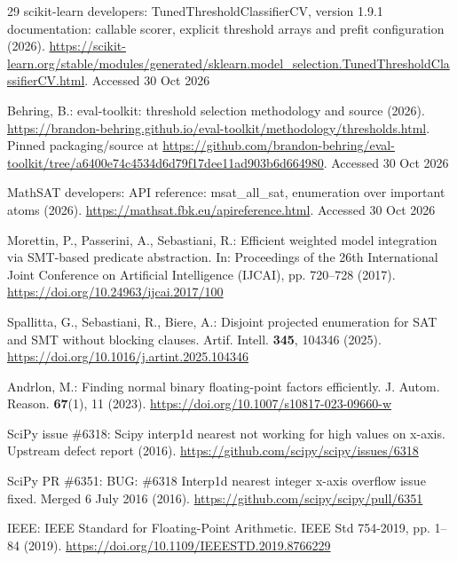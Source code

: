\documentclass[11pt,a4paper]{article}
\theoremstyle{plain}
\theoremstyle{definition}
\theoremstyle{remark}
\begin{document}
\begin{thebibliography}{29}
scikit-learn developers: TunedThresholdClassifierCV, version 1.9.1 documentation: callable scorer, explicit threshold arrays and prefit configuration (2026). \url{https://scikit-learn.org/stable/modules/generated/sklearn.model_selection.TunedThresholdClassifierCV.html}. Accessed 30 Oct 2026

Behring, B.: eval-toolkit: threshold selection methodology and source (2026). \url{https://brandon-behring.github.io/eval-toolkit/methodology/thresholds.html}. Pinned packaging/source at \url{https://github.com/brandon-behring/eval-toolkit/tree/a6400e74c4534d6d79f17dee11ad903b6d664980}. Accessed 30 Oct 2026

MathSAT developers: API reference: msat\_all\_sat, enumeration over important atoms (2026). \url{https://mathsat.fbk.eu/apireference.html}. Accessed 30 Oct 2026

Morettin, P., Passerini, A., Sebastiani, R.: Efficient weighted model integration via SMT-based predicate abstraction. In: Proceedings of the 26th International Joint Conference on Artificial Intelligence (IJCAI), pp. 720--728 (2017). \url{https://doi.org/10.24963/ijcai.2017/100}

Spallitta, G., Sebastiani, R., Biere, A.: Disjoint projected enumeration for SAT and SMT without blocking clauses. Artif. Intell. \textbf{345}, 104346 (2025). \url{https://doi.org/10.1016/j.artint.2025.104346}

Andrlon, M.: Finding normal binary floating-point factors efficiently. J. Autom. Reason. \textbf{67}(1), 11 (2023). \url{https://doi.org/10.1007/s10817-023-09660-w}

SciPy issue \#6318: Scipy interp1d nearest not working for high values on x-axis. Upstream defect report (2016). \url{https://github.com/scipy/scipy/issues/6318}

SciPy PR \#6351: BUG: \#6318 Interp1d nearest integer x-axis overflow issue fixed. Merged 6 July 2016 (2016). \url{https://github.com/scipy/scipy/pull/6351}

IEEE: IEEE Standard for Floating-Point Arithmetic. IEEE Std 754-2019, pp. 1--84 (2019). \url{https://doi.org/10.1109/IEEESTD.2019.8766229}
\end{thebibliography}
\endgroup
\end{document}
